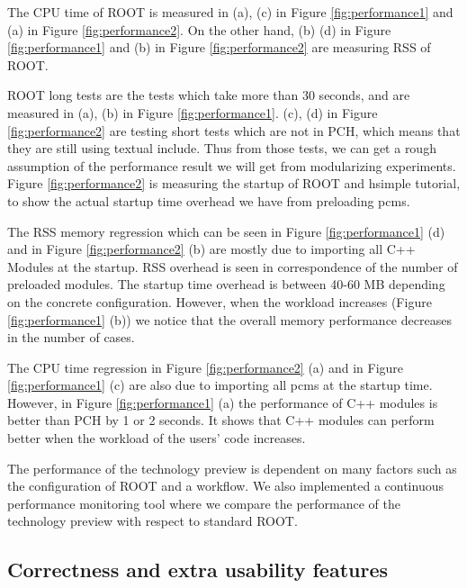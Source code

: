 \documentclass{webofc}
\begin{document}
The CPU time of ROOT is measured in (a), (c) in Figure \ref{fig:performance1} and (a) in Figure \ref{fig:performance2}. On the other hand, (b) (d) in Figure \ref{fig:performance1} and (b) in Figure \ref{fig:performance2} are measuring RSS of ROOT.

ROOT long tests are the tests which take more than 30 seconds, and are measured in (a), (b) in Figure \ref{fig:performance1}. (c), (d) in Figure \ref{fig:performance2} are testing short tests which are not in PCH, which means that they are still using textual include. Thus from those tests, we can get a rough assumption of the performance result we will get from modularizing experiments. Figure \ref{fig:performance2} is measuring the startup of ROOT and hsimple tutorial, to show the actual startup time overhead we have from preloading pcms.

The RSS memory regression which can be seen in Figure \ref{fig:performance1} (d) and in Figure \ref{fig:performance2} (b) are mostly due to importing all C++ Modules at the startup. RSS overhead is seen in correspondence of the number of preloaded modules. The startup time overhead is between 40-60 MB depending on the concrete configuration. However, when the workload increases (Figure \ref{fig:performance1} (b)) we notice that the overall memory performance decreases in the number of cases.

The CPU time regression in Figure \ref{fig:performance2} (a) and in Figure \ref{fig:performance1} (c) are also due to importing all pcms at the startup time. However, in Figure \ref{fig:performance1} (a) the performance of C++ modules is better than PCH by 1 or 2 seconds. It shows that C++ modules can perform better when the workload of the users' code increases.

The performance of the technology preview is dependent on many factors such as the configuration of ROOT and a workflow. We also implemented a continuous performance monitoring tool \cite{rootbench} where we compare the performance of the technology preview with respect to standard ROOT.

\subsection{Correctness and extra usability features}
\label{correctness}
\end{document}
